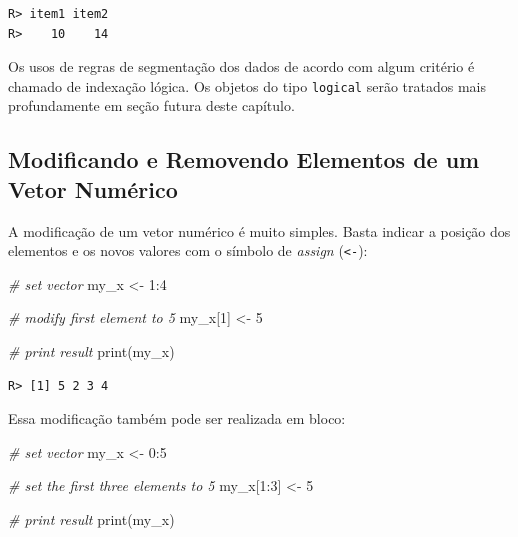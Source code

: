 \documentclass[
  11pt,
]{book}
\newenvironment{Shaded}{\begin{snugshade}}{\end{snugshade}}
\newcommand{\CommentTok}[1]{\textcolor[rgb]{0.37,0.37,0.37}{\textit{#1}}}
\newcommand{\DecValTok}[1]{\textcolor[rgb]{0.06,0.06,0.06}{#1}}
\newcommand{\FunctionTok}[1]{\textcolor[rgb]{0,0,0}{#1}}
\newcommand{\NormalTok}[1]{#1}
\newcommand{\OtherTok}[1]{\textcolor[rgb]{0.37,0.37,0.37}{#1}}
\newcommand{\SpecialCharTok}[1]{\textcolor[rgb]{0,0,0}{#1}}
\begin{document}
\begin{verbatim}
R> item1 item2 
R>    10    14
\end{verbatim}

Os usos de regras de segmentação dos dados de acordo com algum critério é chamado de indexação lógica. Os objetos do tipo \texttt{logical} serão tratados mais profundamente em seção futura deste capítulo.

\hypertarget{modificando-e-removendo-elementos-de-um-vetor-numuxe9rico}{%
\subsection{Modificando e Removendo Elementos de um Vetor Numérico}\label{modificando-e-removendo-elementos-de-um-vetor-numuxe9rico}}

A modificação de um vetor numérico é muito simples. Basta indicar a posição dos elementos e os novos valores com o símbolo de \emph{assign} (\texttt{\textless{}-}):

\begin{Shaded}
\begin{Highlighting}[]
\CommentTok{\# set vector}
\NormalTok{my\_x }\OtherTok{\textless{}{-}} \DecValTok{1}\SpecialCharTok{:}\DecValTok{4}

\CommentTok{\# modify first element to 5}
\NormalTok{my\_x[}\DecValTok{1}\NormalTok{] }\OtherTok{\textless{}{-}} \DecValTok{5}

\CommentTok{\# print result}
\FunctionTok{print}\NormalTok{(my\_x)}
\end{Highlighting}
\end{Shaded}

\begin{verbatim}
R> [1] 5 2 3 4
\end{verbatim}

Essa modificação também pode ser realizada em bloco:

\begin{Shaded}
\begin{Highlighting}[]
\CommentTok{\# set vector}
\NormalTok{my\_x }\OtherTok{\textless{}{-}} \DecValTok{0}\SpecialCharTok{:}\DecValTok{5}

\CommentTok{\# set the first three elements to 5}
\NormalTok{my\_x[}\DecValTok{1}\SpecialCharTok{:}\DecValTok{3}\NormalTok{] }\OtherTok{\textless{}{-}} \DecValTok{5}

\CommentTok{\# print result}
\FunctionTok{print}\NormalTok{(my\_x)}
\end{Highlighting}
\end{Shaded}
\end{document}
